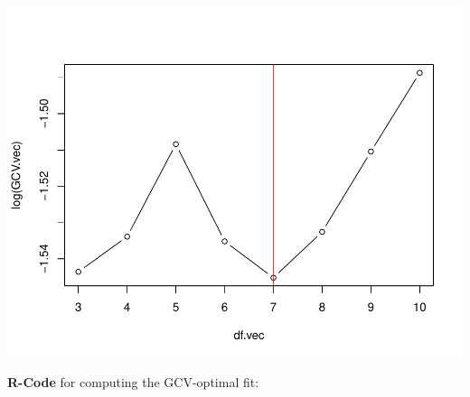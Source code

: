 \documentclass[14pt]{extreport}\usepackage[]{graphicx}\usepackage[]{xcolor}
\makeatletter
\def\maxwidth{ %
  \ifdim\Gin@nat@width>\linewidth
    \linewidth
  \else
    \Gin@nat@width
  \fi
}
\newenvironment{knitrout}{}{} %
\makeatother
\begin{document}
\begin{knitrout}
{\centering \includegraphics[width=\maxwidth]{figure/unnamed-chunk-12-1} 

}


\end{knitrout}

\textbf{R-Code} for computing the GCV-optimal fit:
\end{document}
